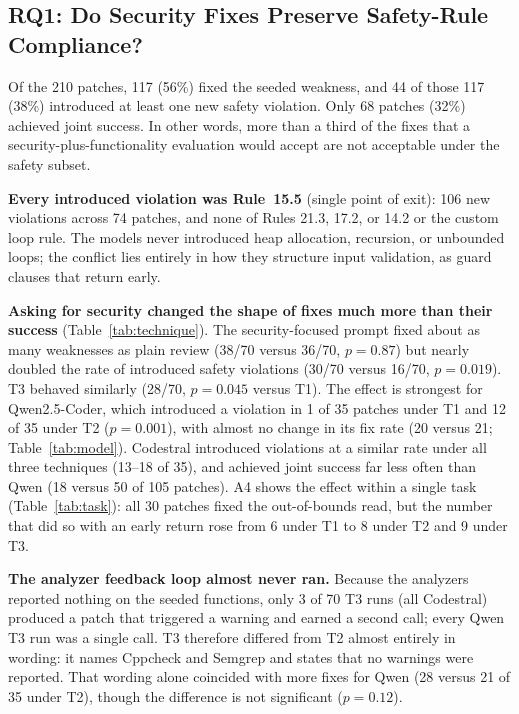 \documentclass[12pt]{IEEEtran}
\begin{document}
\subsection{RQ1: Do Security Fixes Preserve Safety-Rule Compliance?}
Of the 210 patches, 117 (56\%) fixed the seeded weakness, and 44 of those 117 (38\%) introduced at least one new safety violation. Only 68 patches (32\%) achieved joint success. In other words, more than a third of the fixes that a security-plus-functionality evaluation would accept are not acceptable under the safety subset.

\textbf{Every introduced violation was Rule~15.5} (single point of exit): 106 new violations across 74 patches, and none of Rules 21.3, 17.2, or 14.2 or the custom loop rule. The models never introduced heap allocation, recursion, or unbounded loops; the conflict lies entirely in how they structure input validation, as guard clauses that return early.

\textbf{Asking for security changed the shape of fixes much more than their success} (Table~\ref{tab:technique}). The security-focused prompt fixed about as many weaknesses as plain review (38/70 versus 36/70, $p = 0.87$) but nearly doubled the rate of introduced safety violations (30/70 versus 16/70, $p = 0.019$). T3 behaved similarly (28/70, $p = 0.045$ versus T1). The effect is strongest for Qwen2.5-Coder, which introduced a violation in 1 of 35 patches under T1 and 12 of 35 under T2 ($p = 0.001$), with almost no change in its fix rate (20 versus 21; Table~\ref{tab:model}). Codestral introduced violations at a similar rate under all three techniques (13--18 of 35), and achieved joint success far less often than Qwen (18 versus 50 of 105 patches). A4 shows the effect within a single task (Table~\ref{tab:task}): all 30 patches fixed the out-of-bounds read, but the number that did so with an early return rose from 6 under T1 to 8 under T2 and 9 under T3.

\textbf{The analyzer feedback loop almost never ran.} Because the analyzers reported nothing on the seeded functions, only 3 of 70 T3 runs (all Codestral) produced a patch that triggered a warning and earned a second call; every Qwen T3 run was a single call. T3 therefore differed from T2 almost entirely in wording: it names Cppcheck and Semgrep and states that no warnings were reported. That wording alone coincided with more fixes for Qwen (28 versus 21 of 35 under T2), though the difference is not significant ($p = 0.12$).
\end{document}
